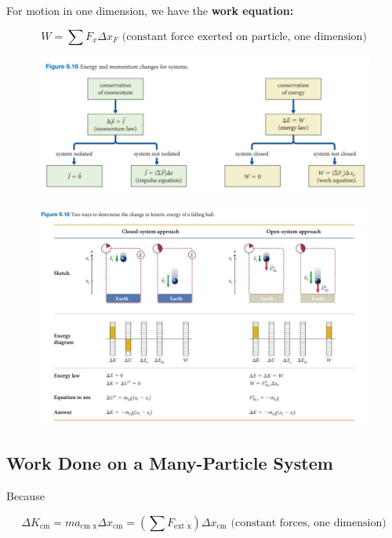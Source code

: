         For motion in one dimension, we have the \textbf{work equation:}

        \[
            W = \sum F_x \Delta x_F \text{ (constant force exerted on particle, one dimension)}
        \]

        \begin{figure}[hbt!]
            \centering
            \includegraphics[]{Resources/Energy_Momentum_Changes}
        \end{figure}

        \begin{figure}[hbt!]
            \centering
            \includegraphics[]{Resources/Kinetic_Energy_Falling_Ball}
        \end{figure}

    \subsection{Work Done on a Many-Particle System}

        Because

        \[
            \Delta K_{\text{cm}} = ma_{\text{cm x}}\Delta x_{\text{cm}} = \left(\sum F_{\text{ext x}}\right)\Delta x_{\text{cm}} \text{ (constant forces, one dimension)}
        \]

